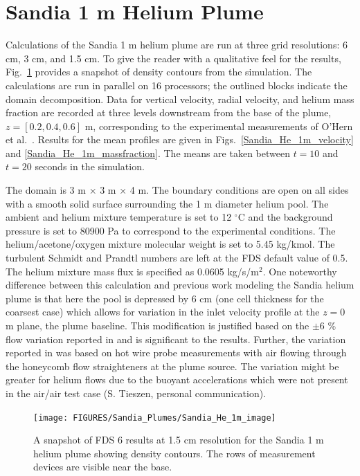 \clearpage


\section{Sandia 1 m Helium Plume}
\label{Sandia plume}

Calculations of the Sandia 1 m helium plume are run at three grid resolutions: 6 cm, 3 cm, and 1.5 cm.  To give the reader with a qualitative feel for the results, Fig.~\ref{Sandia_He_1m_image} provides a snapshot of density contours from the simulation. The calculations are run in parallel on 16 processors; the outlined blocks indicate the domain decomposition.  Data for vertical velocity, radial velocity, and helium mass fraction are recorded at three levels downstream from the base of the plume, $z = [0.2, 0.4, 0.6]$ m, corresponding to the experimental measurements of O'Hern et al.~\cite{OHern:2005}.  Results for the mean profiles are given in Figs.~\ref{Sandia_He_1m_velocity} and \ref{Sandia_He_1m_massfraction}.  The means are taken between $t=10$ and $t=20$ seconds in the simulation.

The domain is 3 m $\times$ 3 m $\times$ 4 m. The boundary conditions are open on all sides with a smooth solid surface surrounding the 1 m diameter helium pool.  The ambient and helium mixture temperature is set to 12 $^\circ$C and the background pressure is set to 80900 Pa to correspond to the experimental conditions.  The helium/acetone/oxygen mixture molecular weight is set to 5.45 kg/kmol.  The turbulent Schmidt and Prandtl numbers are left at the FDS default value of 0.5.  The helium mixture mass flux is specified as 0.0605 kg/s/m$^2$.  One noteworthy difference between this calculation and previous work modeling the Sandia helium plume \cite{DesJardin:2004} is that here the pool is depressed by 6 cm (one cell thickness for the coarsest case) which allows for variation in the inlet velocity profile at the $z=0$ m plane, the plume baseline.  This modification is justified based on the $\pm 6$ \% flow variation reported in \cite{Blanchat:2001} and is significant to the results.  Further, the variation reported in \cite{Blanchat:2001} was based on hot wire probe measurements with air flowing through the honeycomb flow straighteners at the plume source.  The variation might be greater for helium flows due to the buoyant accelerations which were not present in the air/air test case (S. Tieszen, personal communication).

\begin{figure}[h]
\begin{center}
\texttt{[image: FIGURES/Sandia\_Plumes/Sandia\_He\_1m\_image]}
\caption[Sandia 1~m helium plume image.]{A snapshot of FDS 6 results at 1.5 cm resolution for the Sandia 1 m helium plume showing density contours.  The rows of measurement devices are visible near the base.}
\label{Sandia_He_1m_image}
\end{center}
\end{figure}

